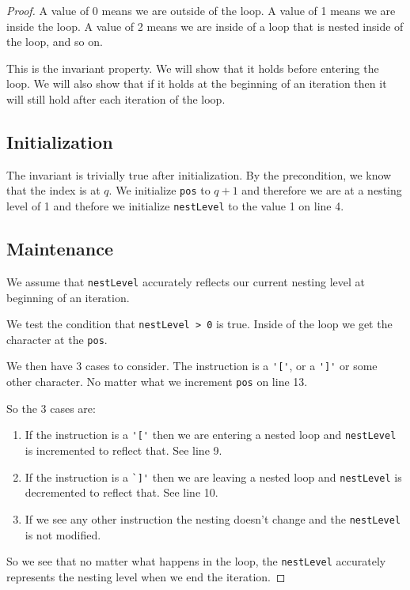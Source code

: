 \documentclass[10pt]{amsart}
\newcommand{\inl}{\lstinline[breaklines=true]}
\begin{document}
\begin{proof}
A value of 0 means we are outside of the loop. A value of 1 means we are inside
the loop.  A value of 2 means we are inside of a loop that is nested inside of
the loop, and so on.

This is the invariant property. We will show that it holds before entering the
loop.  We will also show that if it holds at the beginning of an
iteration then it will still hold after each iteration of the loop.


\subsection*{Initialization}
The invariant is trivially true after initialization. By the precondition, we
know that the index is at $q$. We initialize \inl!pos! to $q+1$ and therefore
we are at a nesting level of 1 and thefore we initialize \inl!nestLevel! to the
value 1 on line 4.

\subsection*{Maintenance}
We assume that \inl!nestLevel! accurately
reflects our current nesting level at beginning of an iteration.

We test the condition that \inl!nestLevel > 0! is true. Inside of the loop
we get the character at the \inl!pos!.

We then have 3 cases to consider. The instruction is a \inl!'['!, or a
\inl!']'! or some other character. No matter what we increment \inl!pos!  on
line 13.

So the 3 cases are:

\begin{enumerate}
\item If the instruction is a \inl!'['! then we are entering a nested loop and
\inl!nestLevel! is incremented to reflect that. See line 9. 

\item If the instruction is a \inl!`]'! then we are leaving a nested loop and
\inl!nestLevel! is decremented to reflect that. See line 10.

\item If we see any other instruction the nesting doesn't change and
the \inl!nestLevel! is not modified.
\end{enumerate}

So we see that no matter what happens in the loop, the \inl!nestLevel!
accurately represents the nesting level when we end the iteration.


\end{proof}
\end{document}
